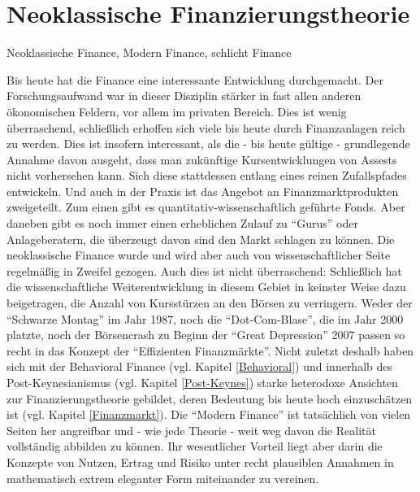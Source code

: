 %
%
%

\chapter{Neoklassische Finanzierungstheorie}
\label{Finance}

Neoklassische Finance, Modern Finance, schlicht Finance

Bis heute hat die Finance eine interessante Entwicklung durchgemacht. Der Forschungsaufwand war in dieser Disziplin stärker in fast allen anderen ökonomischen Feldern, vor allem im privaten Bereich. Dies ist wenig überraschend, schließlich erhoffen sich viele bis heute durch Finanzanlagen reich zu werden. Dies ist insofern interessant, als die - bis heute gültige - grundlegende Annahme davon ausgeht, dass man zukünftige Kursentwicklungen von Assests nicht vorhersehen kann. Sich diese stattdessen entlang eines reinen Zufallspfades entwickeln. Und auch in der Praxis ist das Angebot an Finanzmarktprodukten zweigeteilt. Zum einen gibt es quantitativ-wissenschaftlich geführte Fonds. Aber daneben gibt es noch immer einen erheblichen Zulauf zu "`Gurus"' oder Anlageberatern, die überzeugt davon sind den Markt schlagen zu können. Die neoklassische Finance wurde und wird aber auch von wissenschaftlicher Seite regelmäßig in Zweifel gezogen. Auch dies ist nicht überraschend: Schließlich hat die wissenschaftliche Weiterentwicklung in diesem Gebiet in keinster Weise dazu beigetragen, die Anzahl von Kursstürzen an den Börsen zu verringern. Weder der "`Schwarze Montag"' im Jahr 1987, noch die "`Dot-Com-Blase"', die im Jahr 2000 platzte, noch der Börsencrash zu Beginn der "`Great Depression"' 2007 passen so recht in das Konzept der "`Effizienten Finanzmärkte"'. Nicht zuletzt deshalb haben sich mit der Behavioral Finance (vgl. Kapitel \ref{Behavioral}) und innerhalb des Post-Keynesianismus (vgl. Kapitel \ref{Post-Keynes}) starke heterodoxe Ansichten zur Finanzierungstheorie gebildet, deren Bedeutung bis heute hoch einzuschätzen ist (vgl. Kapitel \ref{Finanzmarkt}). Die "`Modern Finance"' ist tatsächlich von vielen Seiten her angreifbar und - wie jede Theorie - weit weg davon die Realität vollständig abbilden zu können. Ihr wesentlicher Vorteil liegt aber darin die Konzepte von Nutzen, Ertrag und Risiko unter recht plausiblen Annahmen in mathematisch extrem eleganter Form miteinander zu vereinen. 



